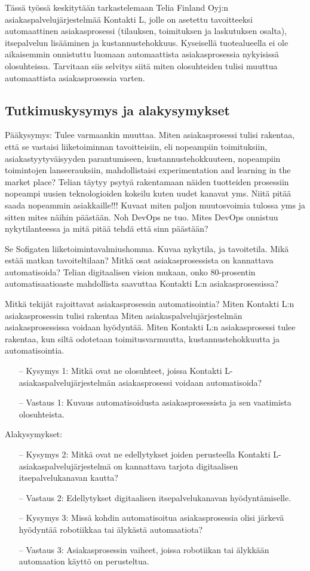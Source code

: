 \documentclass[finnish,12pt,a4paper,pdftex]{article}
\begin{document}
Tässä työssä keskitytään tarkastelemaan
Telia Finland Oyj:n asiakaspalvelujärjestelmää Kontakti L, jolle on asetettu tavoitteeksi automaattinen asiakasprosessi (tilauksen, toimituksen ja laskutuksen osalta), itsepalvelun lisääminen ja kustannustehokkuus. Kyseisellä tuotealueella ei ole aikaisemmin onnistuttu luomaan automaattista asiakasprosessia nykyisissä olosuhteissa. Tarvitaan siis selvitys siitä miten olosuhteiden tulisi muuttua automaattista asiakasprosessia varten.

\subsection{Tutkimuskysymys ja alakysymykset}

Pääkysymys: Tulee varmaankin muuttaa.
Miten asiakasprosessi tulisi rakentaa, että se vastaisi liiketoiminnan tavoitteisiin, eli nopeampiin toimituksiin, asiakastyytyväisyyden parantumiseen, kustannustehokkuuteen, nopeampiin toimintojen lanseerauksiin, mahdollistaisi experimentation and learning in the market place?
Telian täytyy psytyä rakentamaan näiden tuotteiden prosessiin nopeampi uusien teknologioiden kokeilu kuten uudet kanavat  yms. Niitä pitää saada nopeammin asiakkaille!!! Kuvaat miten paljon muutosvoimia tulossa yms ja sitten mites näihin päästään. Noh DevOps ne tuo. Mites DevOps onnistuu nykytilanteessa ja mitä pitää tehdä että sinn päästään?

Se Sofigaten liiketoimintavalmiushomma. Kuvaa nykytila, ja tavoitetila. Mikä estää matkan tavoiteltilaan? 
Mitkä osat asiakasprosessista on kannattava automatisoida?
Telian digitaalisen vision mukaan, onko 80-prosentin automatisaatioaste mahdollista saavuttaa Kontakti L:n asiakasprosessissa?

Mitkä tekijät rajoittavat asiakasprosessin automatisointia?
Miten Kontakti L:n asiakasprosessin tulisi rakentaa Miten asiakaspalvelujärjestelmän asiakasprosessissa voidaan hyödyntää.
Miten Kontakti L:n asiakasprosessi tulee rakentaa, kun siltä odotetaan toimitusvarmuutta, kustannustehokkuutta ja automatisointia.
\begin{itemize}
\item[--]Kysymys 1: Mitkä ovat ne olosuhteet, joissa Kontakti L- asiakaspalvelujärjestelmän asiakasprosessi voidaan automatisoida?
\item[--]Vastaus 1: Kuvaus automatisoidusta asiakasprosessista ja sen vaatimista olosuhteista.
\end{itemize}

Alakysymykset:
\begin{itemize}
\item[--]Kysymys 2: Mitkä ovat ne edellytykset joiden perusteella Kontakti L- asiakaspalvelujärjestelmä on kannattava tarjota digitaalisen itsepalvelukanavan kautta?
\item[--]Vastaus 2: Edellytykset digitaalisen itsepalvelukanavan hyödyntämiselle.
\item[--]Kysymys 3: Missä kohdin automatisoitua asiakasprosessia olisi järkevä hyödyntää robotiikkaa tai älykästä automaatiota?
\item[--]Vastaus 3: Asiakasprosessin vaiheet, joissa robotiikan tai älykkään automaation käyttö on perusteltua.

\end{itemize}
\end{document}
